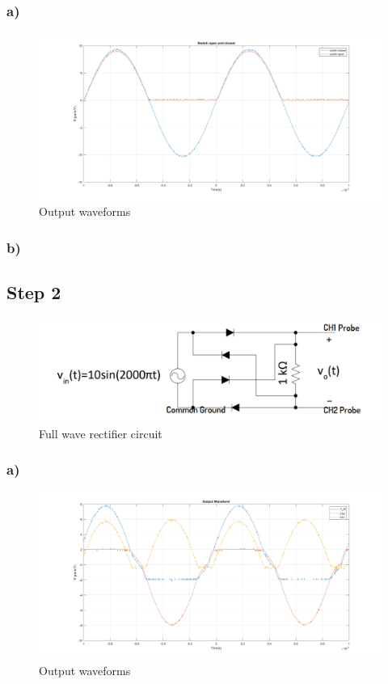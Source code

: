 \documentclass[letterpaper,12pt]{article}
\begin{document}
\subsubsection{a)}
\begin{figure}[H]
	\centering
   \includegraphics[width=1\textwidth]{1a_plot.png}
   \caption{Output waveforms}
\end{figure}
\subsubsection{b)}
\subsection{Step 2}
\begin{figure}[H]
	\centering
   \includegraphics[width=1\textwidth]{full_vave_sch.png}
   \caption{Full wave rectifier circuit}
\end{figure}

\subsubsection{a)}
\begin{figure}[H]
	\centering
   \includegraphics[width=1\textwidth]{2a_plot.png}
   \caption{Output waveforms}
\end{figure}
\end{document}
